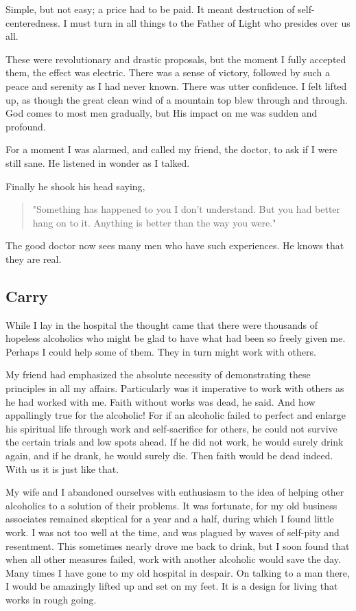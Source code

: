 Simple, but not easy; a price had to be paid.
It meant destruction of self-centeredness.
I must turn in all things to the Father of Light who presides over us all.

These were revolutionary and drastic proposals, but the moment I fully accepted them, the effect was electric.
There was a sense of victory, followed by such a peace and serenity as I had never known.
There was utter confidence.
I felt lifted up, as though the great clean wind of a mountain top blew through and through.
God comes to most men gradually, but His impact on me was sudden and profound.

For a moment I was alarmed, and called my friend, the doctor, to ask if I were still sane.
He listened in wonder as I talked.

Finally he shook his head saying,
\begin{quote}
"Something has happened to you I don't understand.
But you had better hang on to it.
Anything is better than the way you were."
\end{quote}
The good doctor now sees many men who have such experiences.
He knows that they are real.


\subsection{Carry}

While I lay in the hospital the thought came that there were thousands of hopeless alcoholics who might be glad to have what had been so freely given me.
Perhaps I could help some of them.
They in turn might work with others.

My friend had emphasized the absolute necessity of demonstrating these principles in all my affairs.
Particularly was it imperative to work with others as he had worked with me.
Faith without works was dead, he said.
And how appallingly true for the alcoholic!
For if an alcoholic failed to perfect and enlarge his spiritual life through work and self-sacrifice for others, he could not survive the certain trials and low spots ahead.
If he did not work, he would surely drink again, and if he drank, he would surely die.
Then faith would be dead indeed.
With us it is just like that.

My wife and I abandoned ourselves with enthusiasm to the idea of helping other alcoholics to a solution of their problems.
It was fortunate, for my old business associates remained skeptical for a year and a half, during which I found little work.
I was not too well at the time, and was plagued by waves of self-pity and resentment.
This sometimes nearly drove me back to drink, but I soon found that when all other measures failed, work with another alcoholic would save the day.
Many times I have gone to my old hospital in despair.
On talking to a man there, I would be amazingly lifted up and set on my feet.
It is a design for living that works in rough going.

